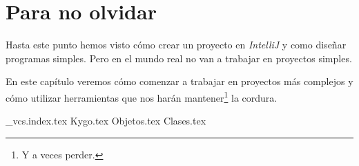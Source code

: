 \chapter{Para no olvidar}
  Hasta este punto hemos visto cómo crear un proyecto en \textit{IntelliJ} y como diseñar programas
  simples.
  Pero en el mundo real no van a trabajar en proyectos simples.
  
  En este capítulo veremos cómo comenzar a trabajar en proyectos más complejos y cómo utilizar
  herramientas que nos harán mantener\footnote{Y a veces perder.} la cordura.

  {_vcs.index.tex}
  {Kygo.tex}
  {Objetos.tex}
  {Clases.tex}
  \nocite{*}
  \printbibliography[keyword=oop]
